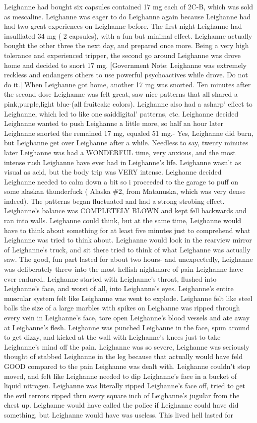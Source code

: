 \documentclass[12pt]{book}
\begin{document}
Leighanne had bought six capsules contained 17 mg each of 2C-B, which was sold as mescaline. Leighanne was eager to do Leighanne again because Leighanne had had two great experiences on Leighanne before. The first night Leighanne had insufflated 34 mg ( 2 capsules), with a fun but minimal effect. Leighanne actually bought the other three the next day, and prepared once more. Being a very high tolerance and experienced tripper, the second go around Leighanne was drove home and decided to snort 17 mg. [Government Note: Leighanne was extremely reckless and endangers others to use powerful psychoactives while drove. Do not do it.] When Leighanne got home, another 17 mg was snorted. Ten minutes after the second dose Leighanne was felt great, saw nice patterns that all shared a pink,purple,light blue-(all fruitcake colors). Leighanne also had a asharp' effect to Leighanne, which led to like one saiddigital' patterns, etc. Leighanne decided Leighanne wanted to push Leighanne a little more, so half an hour later Leighanne snorted the remained 17 mg, equaled 51 mg.- Yes, Leighanne did burn, but Leighanne get over Leighanne after a while. Needless to say, twenty minutes later Leighanne was had a WONDERFUL time, very anxious, and the most intense rush Leighanne have ever had in Leighanne's life. Leighanne wasn't as visual as acid, but the body trip was VERY intense. Leighanne decided Leighanne needed to calm down a bit so i proceeded to the garage to puff on some alaskan thunderfuck ( Alaska \#2, from Matanuska, which was very dense indeed). The patterns began fluctuated and had a strong strobing effect. Leighanne's balance was COMPLETELY BLOWN and kept fell backwards and ran into walls. Leighanne could think, but at the same time, Leighanne would have to think about something for at least five minutes just to comprehend what Leighanne was tried to think about. Leighanne would look in the rearview mirror of Leighanne's truck, and sit there tried to think of what Leighanne was actually saw. The good, fun part lasted for about two hours- and unexpectedly, Leighanne was deliberately threw into the most hellish nightmare of pain Leighanne have ever endured. Leighanne started with Leighanne's throat, flushed into Leighanne's face, and worst of all, into Leighanne's eyes. Leighanne's entire muscular system felt like Leighanne was went to explode. Leighanne felt like steel balls the size of a large marbles with spikes on Leighanne was ripped through every vein in Leighanne's face, tore open Leighanne's blood vessels and ate away at Leighanne's flesh. Leighanne was punched Leighanne in the face, spun around to get dizzy, and kicked at the wall with Leighanne's knees just to take Leighanne's mind off the pain. Leighanne was so severe, Leighanne was seriously thought of stabbed Leighanne in the leg because that actually would have feld GOOD compared to the pain Leighanne was dealt with. Leighanne couldn't stop moved, and felt like Leighanne needed to dip Leighanne's face in a bucket of liquid nitrogen. Leighanne was literally ripped Leighanne's face off, tried to get the evil terrors ripped thru every square inch of Leighanne's jugular from the chest up. Leighanne would have called the police if Leighanne could have did something, but Leighanne would have was useless. This lived hell lasted for 
\end{document}
